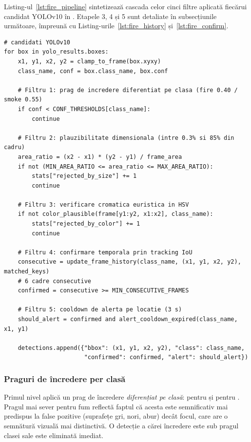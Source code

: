 \documentclass[../../main.tex]{subfiles}
\begin{document}
Listing-ul~\ref{lst:fire_pipeline} sintetizează cascada celor cinci filtre aplicată fiecărui candidat YOLOv10 în . Etapele 3, 4 și 5 sunt detaliate în subsecțiunile următoare, împreună cu Listing-urile~\ref{lst:fire_history} și~\ref{lst:fire_confirm}.

\begin{listing}[H]
\begin{verbatim}
# candidati YOLOv10
for box in yolo_results.boxes:
    x1, y1, x2, y2 = clamp_to_frame(box.xyxy)
    class_name, conf = box.class_name, box.conf

    # Filtru 1: prag de incredere diferentiat pe clasa (fire 0.40 / smoke 0.55)
    if conf < CONF_THRESHOLDS[class_name]:
        continue

    # Filtru 2: plauzibilitate dimensionala (intre 0.3% si 85% din cadru)
    area_ratio = (x2 - x1) * (y2 - y1) / frame_area
    if not (MIN_AREA_RATIO <= area_ratio <= MAX_AREA_RATIO):
        stats["rejected_by_size"] += 1
        continue

    # Filtru 3: verificare cromatica euristica in HSV
    if not color_plausible(frame[y1:y2, x1:x2], class_name):
        stats["rejected_by_color"] += 1
        continue

    # Filtru 4: confirmare temporala prin tracking IoU
    consecutive = update_frame_history(class_name, (x1, y1, x2, y2), matched_keys)
    # 6 cadre consecutive
    confirmed = consecutive >= MIN_CONSECUTIVE_FRAMES

    # Filtru 5: cooldown de alerta pe locatie (3 s)
    should_alert = confirmed and alert_cooldown_expired(class_name, x1, y1)

    detections.append({"bbox": (x1, y1, x2, y2), "class": class_name,
                       "confirmed": confirmed, "alert": should_alert})
\end{verbatim}
\caption{Cascada celor cinci filtre aplicată fiecărui candidat (\texttt{process\_frame} din \texttt{fire\_detection\_system.py}).}
\label{lst:fire_pipeline}
\end{listing}

\subsubsection{Praguri de încredere per clasă}
\label{subsubsec:praguri_incredere}

Primul nivel aplică un prag de încredere \textit{diferențiat pe clasă}: 
pentru  și  pentru . Pragul mai sever pentru
fum reflectă faptul că acesta este semnificativ mai predispus la false pozitive (suprafețe gri,
nori, abur) decât focul, care are o semnătură vizuală mai distinctivă. O detecție a cărei
încredere este sub pragul clasei sale este eliminată imediat.
\end{document}

